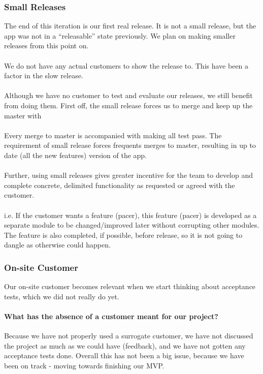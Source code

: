 \subsubsection{Small Releases}
The end of this iteration is our first real release. It is not a small release, but the app was not in a “releasable” state previously. We plan on making smaller releases from this point on.\\\\
We do not have any actual customers to show the release to. This have been a factor in the slow release.\\\\
Although we have no customer to test and evaluate our releases, we still benefit from doing them.
First off, the small release forces us to merge and keep up the master with\\\\
Every merge to master is accompanied with making all test pass. The requirement of small release forces frequents merges to master, resulting in up to date (all the new features)  version of the app.\\\\
Further, using small releases gives greater incentive for the team to develop and complete concrete, delimited functionality %
as requested or agreed with the customer.\\\\ 
i.e. If the customer wants a feature (pacer), this feature (pacer) is developed as a separate module to be changed/improved later without corrupting other modules. The feature is also completed, if possible, before release, so it is not going to dangle as otherwise could happen.

\subsubsection{On-site Customer}
Our on-site customer becomes relevant when we start thinking about acceptance tests, which we did not really do yet.

\paragraph{What has the absence of a customer meant for our project?}
Because we have not properly used a surrogate customer, we have not discussed the project as much as we could have (feedback), and we have not gotten any acceptance tests done. Overall this has not been a big issue, because we have been on track - moving towards finishing our MVP.

